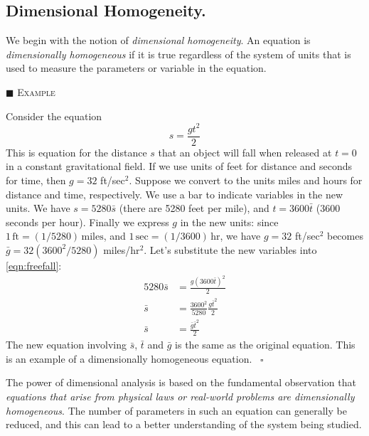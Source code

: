 \documentclass[reqno]{immbook}
\numberwithin{equation}{chapter}
\numberwithin{question}{section}
\numberwithin{theorem}{chapter}
\numberwithin{figure}{chapter}
\theoremstyle{definition}
\newenvironment{xexample}%
{%

\medskip\noindent\addtocounter{example}{1}$\blacksquare$ \textsc{Example \theexample}\hspace*{1em}%
}%
{%
~\hfill$\square$

\medskip
}
\begin{document}
\subsection{Dimensional Homogeneity.}
We begin with the notion of \emph{dimensional
homogeneity}.
An equation is \emph{dimensionally homogeneous}
if it is true regardless of the system
of units that is used to measure the parameters
or variable in the equation.
\begin{xexample}
Consider the equation
\begin{equation}
   s = \frac{gt^2}{2}
\label{eqn:freefall}
\end{equation}
This is equation for the
distance $s$ that an object will fall when released
at $t=0$ in a constant gravitational field.
If we use units of feet for distance and seconds
for time, then $g=32$ ft/sec$^2$.
Suppose we convert to the units miles and hours
for distance and time, respectively.
We use a bar to indicate variables in the 
new units.  We have $s = 5280\bar{s}$ (there
are 5280 feet per mile), and $t = 3600\bar{t}$
($3600$ seconds per hour).
Finally we express $g$ in the new units:
since $1 \,\textrm{ft} = (1/5280) \,\textrm{miles}$, and
$1 \,\textrm{sec} = (1/3600) \,\textrm{hr}$, we have
$g = 32$ ft/sec$^2$ becomes $\bar{g} = 32 (3600^2/5280)$
miles/hr$^2$.
Let's substitute the new variables into
\eqref{eqn:freefall}:
\begin{equation}
\begin{split}
   5280\bar{s} & = \frac{g\left(3600\bar{t}\right)^2}{2} \\
   \bar{s} & = \frac{3600^2}{5280} \frac{g\bar{t}^2}{2} \\
   \bar{s} & = \frac{\bar{g}\bar{t}^2}{2}
\end{split}
\end{equation}
The new equation involving $\bar{s}$, $\bar{t}$ and $\bar{g}$
is the same as the original equation.
This is an example of a dimensionally homogeneous equation.
\end{xexample}

\medskip
The power of dimensional analysis is based on the
fundamental observation that
\emph{equations that arise from physical laws
or real-world problems are dimensionally homogeneous}.
The number of parameters in such an equation can generally
be reduced, and this can lead to a better understanding
of the system being studied.
\end{document}
